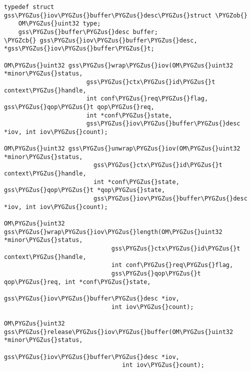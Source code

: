 \documentclass[letterpaper,10pt,english]{sphinxmanual}
\def\PYGZus{\char`\_}
\def\PYGZob{\char`\{}
\def\PYGZcb{\char`\}}
\begin{document}
\begin{Verbatim}[commandchars=\\\{\}]
typedef struct gss\PYGZus{}iov\PYGZus{}buffer\PYGZus{}desc\PYGZus{}struct \PYGZob{}
    OM\PYGZus{}uint32 type;
    gss\PYGZus{}buffer\PYGZus{}desc buffer;
\PYGZcb{} gss\PYGZus{}iov\PYGZus{}buffer\PYGZus{}desc, *gss\PYGZus{}iov\PYGZus{}buffer\PYGZus{}t;

OM\PYGZus{}uint32 gss\PYGZus{}wrap\PYGZus{}iov(OM\PYGZus{}uint32 *minor\PYGZus{}status,
                       gss\PYGZus{}ctx\PYGZus{}id\PYGZus{}t context\PYGZus{}handle,
                       int conf\PYGZus{}req\PYGZus{}flag, gss\PYGZus{}qop\PYGZus{}t qop\PYGZus{}req,
                       int *conf\PYGZus{}state,
                       gss\PYGZus{}iov\PYGZus{}buffer\PYGZus{}desc *iov, int iov\PYGZus{}count);

OM\PYGZus{}uint32 gss\PYGZus{}unwrap\PYGZus{}iov(OM\PYGZus{}uint32 *minor\PYGZus{}status,
                         gss\PYGZus{}ctx\PYGZus{}id\PYGZus{}t context\PYGZus{}handle,
                         int *conf\PYGZus{}state, gss\PYGZus{}qop\PYGZus{}t *qop\PYGZus{}state,
                         gss\PYGZus{}iov\PYGZus{}buffer\PYGZus{}desc *iov, int iov\PYGZus{}count);

OM\PYGZus{}uint32 gss\PYGZus{}wrap\PYGZus{}iov\PYGZus{}length(OM\PYGZus{}uint32 *minor\PYGZus{}status,
                              gss\PYGZus{}ctx\PYGZus{}id\PYGZus{}t context\PYGZus{}handle,
                              int conf\PYGZus{}req\PYGZus{}flag,
                              gss\PYGZus{}qop\PYGZus{}t qop\PYGZus{}req, int *conf\PYGZus{}state,
                              gss\PYGZus{}iov\PYGZus{}buffer\PYGZus{}desc *iov,
                              int iov\PYGZus{}count);

OM\PYGZus{}uint32 gss\PYGZus{}release\PYGZus{}iov\PYGZus{}buffer(OM\PYGZus{}uint32 *minor\PYGZus{}status,
                                 gss\PYGZus{}iov\PYGZus{}buffer\PYGZus{}desc *iov,
                                 int iov\PYGZus{}count);
\end{Verbatim}
\end{document}
